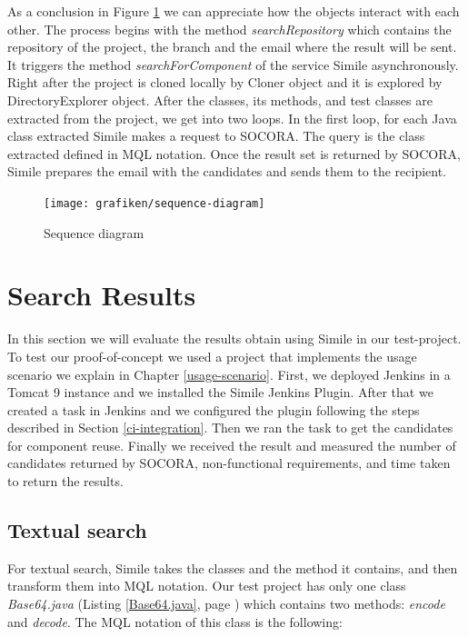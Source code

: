 {As a conclusion in Figure \ref{fig:sequence-diagram} we can appreciate how the objects interact with each other. The process begins with the method \emph{searchRepository} which contains the repository of the project, the branch and the email where the result will be sent. It triggers the method \emph{searchForComponent} of the service Simile asynchronously. Right after the project is cloned locally by Cloner object and it is explored by DirectoryExplorer object. After the classes, its methods, and test classes are extracted from the project, we get into two loops. In the first loop, for each Java class extracted Simile makes a request to SOCORA. The query is the class extracted defined in MQL notation. Once the result set is returned by SOCORA, Simile prepares the email with the candidates and sends them to the recipient.
 
\begin{figure}[H]
	\centering
    \texttt{[image: grafiken/sequence-diagram]}
    \caption{Sequence diagram}
    \label{fig:sequence-diagram}
\end{figure}

\section{Search Results}
In this section we will evaluate the results obtain using Simile in our test-project. To test our proof-of-concept we used a project that implements the usage scenario we explain in Chapter \ref{usage-scenario}. First, we deployed Jenkins in a Tomcat 9 instance and we installed the Simile Jenkins Plugin. After that we created a task in Jenkins and we configured the plugin following the steps described in Section \ref{ci-integration}. Then we ran the task to get the candidates for component reuse. Finally we received the result and measured the number of candidates returned by SOCORA, non-functional requirements, and time taken to return the results.

\subsection{Textual search}
For textual search, Simile takes the classes and the method it contains, and then transform them into MQL notation. Our test project has only one class \emph{Base64.java} (Listing \ref{Base64.java}, page \pageref{Base64.java}) which contains two methods: \emph{encode} and \emph{decode}. The MQL notation of this class is the following:

}
